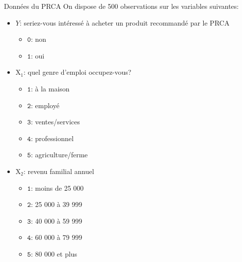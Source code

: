 \documentclass[
  ignorenonframetext,
]{beamer}
\providecommand{\tightlist}{%
  \setlength{\itemsep}{0pt}\setlength{\parskip}{0pt}}\usepackage{longtable,booktabs,array}
\begin{document}
\begin{frame}{Données du PRCA}
\protect\hypertarget{donnuxe9es-du-prca}{}
On dispose de 500 observations sur les variables suivantes:
\footnotesize 

\begin{itemize}
\tightlist
\item
  \(Y\): seriez-vous intéressé à acheter un produit recommandé par le
  PRCA

  \begin{itemize}
  \tightlist
  \item
    \(\texttt{0}\): non
  \item
    \(\texttt{1}\): oui
  \end{itemize}
\item
  \(\mathrm{X}_1\): quel genre d'emploi occupez-vous?

  \begin{itemize}
  \tightlist
  \item
    \(\texttt{1}\): à la maison
  \item
    \(\texttt{2}\): employé
  \item
    \(\texttt{3}\): ventes/services
  \item
    \(\texttt{4}\): professionnel
  \item
    \(\texttt{5}\): agriculture/ferme
  \end{itemize}
\item
  \(\mathrm{X}_2\): revenu familial annuel

  \begin{itemize}
  \tightlist
  \item
    \(\texttt{1}\): moins de 25 000
  \item
    \(\texttt{2}\): 25 000 à 39 999
  \item
    \(\texttt{3}\): 40 000 à 59 999
  \item
    \(\texttt{4}\): 60 000 à 79 999
  \item
    \(\texttt{5}\): 80 000 et plus
  \end{itemize}
\end{itemize}

\normalsize
\end{frame}
\end{document}

